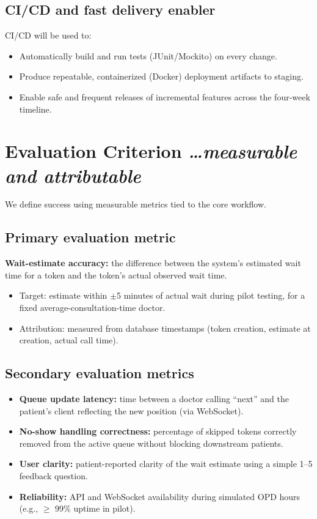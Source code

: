 \documentclass[11pt,a4paper]{article}
\newcommand{\BvrHint}[1]{%
  {\normalfont\normalsize\itshape\hfill #1}}
\begin{document}
\subsection{CI/CD and fast delivery enabler}
CI/CD will be used to:
\begin{itemize}[leftmargin=0.7cm]
    \item Automatically build and run tests (JUnit/Mockito) on every change.
    \item Produce repeatable, containerized (Docker) deployment artifacts to staging.
    \item Enable safe and frequent releases of incremental features across the four-week timeline.
\end{itemize}

\section{Evaluation Criterion %
\BvrHint{\ldots measurable and attributable}}
We define success using measurable metrics tied to the core workflow.

\subsection{Primary evaluation metric}
\textbf{Wait-estimate accuracy:} the difference between the system's estimated wait time for a token and the token's actual observed wait time.
\begin{itemize}[leftmargin=0.7cm]
    \item Target: estimate within $\pm$5 minutes of actual wait during pilot testing, for a fixed average-consultation-time doctor.
    \item Attribution: measured from database timestamps (token creation, estimate at creation, actual call time).
\end{itemize}

\subsection{Secondary evaluation metrics}
\begin{itemize}[leftmargin=0.7cm]
    \item \textbf{Queue update latency:} time between a doctor calling ``next'' and the patient's client reflecting the new position (via WebSocket).
    \item \textbf{No-show handling correctness:} percentage of skipped tokens correctly removed from the active queue without blocking downstream patients.
    \item \textbf{User clarity:} patient-reported clarity of the wait estimate using a simple 1--5 feedback question.
    \item \textbf{Reliability:} API and WebSocket availability during simulated OPD hours (e.g., $\ge$ 99\% uptime in pilot).
\end{itemize}
\end{document}

